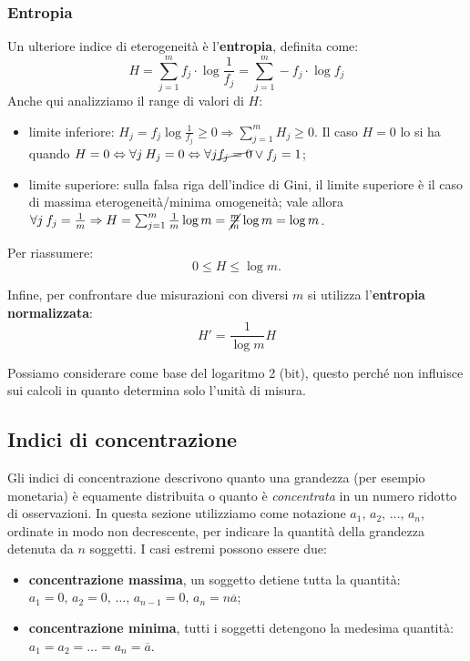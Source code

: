 \subsubsection{Entropia}
Un ulteriore indice di eterogeneità è l'\textbf{entropia}, definita come:
\[
\boxed{
H = \sum_{j=1}^m f_j \cdot \log \frac{1}{f_j} = \sum_{j=1}^m -f_j \cdot \log f_j
}
\]
Anche qui analizziamo il range di valori di $H$:
\begin{itemize}
    \item limite inferiore: $H_j = f_j \log{\frac{1}{f_j}} \geq 0 \Rightarrow \sum_{j=1}^m{H_j} \geq 0$. \newline Il caso $H=0$ lo si ha quando $H = 0 \Leftrightarrow \forall j \: H_j = 0 \Leftrightarrow \forall j \cancel{f_j = 0} \lor f_j = 1$;
    \item limite superiore: sulla falsa riga dell'indice di Gini, il limite superiore è il caso di massima eterogeneità/minima omogeneità; vale allora $\forall j \: f_j = \frac{1}{m} \Rightarrow H = \sum_{j=1}^m{\frac{1}{m} \log{m}} = \cancel{\frac{m}{m}} \log{m} = \log{m}$.
\end{itemize}

\noindent Per riassumere: \[
\boxed{
0 \leq H \leq \log{m}
}.
\]

\noindent Infine, per confrontare due misurazioni con diversi $m$ si utilizza l'\textbf{entropia normalizzata}: 
\[
\boxed{
    H' = \frac{1}{\log{m}}H
}
\]

Possiamo considerare come base del logaritmo 2 (bit), questo perché non influisce sui calcoli in quanto determina solo l'unità di misura.

\subsection{Indici di concentrazione}
Gli indici di concentrazione descrivono quanto una grandezza (per esempio monetaria) è equamente distribuita o quanto è \textit{concentrata} in un numero ridotto di osservazioni. In questa sezione utilizziamo come notazione $a_1, \, a_2, \, \dots, \, a_n$, ordinate in modo non decrescente, per indicare la quantità della grandezza detenuta da $n$ soggetti. I casi estremi possono essere due: \begin{itemize}
    \item \textbf{concentrazione massima}, un soggetto detiene tutta la quantità: $a_1 = 0, \, a_2=0, \, \dots, \, a_{n-1}=0, \, a_{n}=n\overline{a}$;
    \item \textbf{concentrazione minima}, tutti i soggetti detengono la medesima quantità: $a_1 = a_2 = \dots = a_{n} = \overline a$.
\end{itemize}


